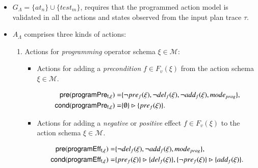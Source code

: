\begin{itemize}
\item $G_{\Lambda}=\{at_n\}\cup\{test_m\}$, requires that the programmed action model is validated in all the actions and states observed from the input plan trace $\tau$.
\item $A_{\Lambda}$ comprises three kinds of actions:
\begin{enumerate}
\item Actions for {\em programming} operator schema $\xi\in\mathcal{M}$:
\begin{itemize}
\item Actions for adding a {\em precondition} $f\in F_v(\xi)$ from the action schema $\xi\in\mathcal{M}$.

\begin{small}
\begin{align*}
\hspace*{7pt}\mathsf{pre}(\mathsf{programPre_{f,\xi}})=&\{\neg pre_{f}(\xi), \neg del_{f}(\xi),\neg add_{f}(\xi), mode_{prog}\},\\
\mathsf{cond}(\mathsf{programPre_{f,\xi}})=&\{\emptyset\}\rhd\{pre_{f}(\xi)\}.
\end{align*}
\end{small}

\item Actions for adding a {\em negative} or {\em positive} effect $f\in F_v(\xi)$ to the action schema $\xi\in\mathcal{M}$.

\begin{small}
\begin{align*}
\hspace*{7pt}\mathsf{pre}(\mathsf{programEff_{f,\xi}})=&\{\neg del_{f}(\xi),\neg add_{f}(\xi), mode_{prog}\},\\
\mathsf{cond}(\mathsf{programEff_{f,\xi}})=&\{pre_{f}(\xi)\}\rhd\{del_{f}(\xi)\},\{\neg pre_{f}(\xi)\}\rhd\{add_{f}(\xi)\}.
\end{align*}
\end{small}
\end{itemize}


\end{enumerate}
\end{itemize}
